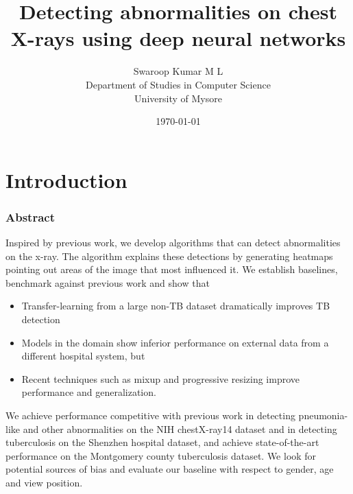 \documentclass[8pt]{beamer}
\title{Detecting abnormalities on chest X-rays using deep neural networks}
\author{
  Swaroop Kumar M L\\
  Department of Studies in Computer Science\\
  University of Mysore
}
\date{\today}
\begin{document}
\maketitle

\section{Introduction}

\begin{frame}
  \frametitle{Abstract} Inspired by previous work, we develop algorithms that
  can detect abnormalities on the x-ray. The algorithm explains these detections
  by generating heatmaps pointing out areas of the image that most influenced
  it. \pause We establish baselines, benchmark against previous work and show
  that \pause
  \begin{itemize}
  \item{Transfer-learning from a large non-TB dataset dramatically improves TB
      detection}\pause
  \item{Models in the domain show inferior performance on external data from a
      different hospital system, but}\pause
  \item{Recent techniques such as mixup and progressive resizing improve
      performance and generalization.}\pause
  \end{itemize}
  We achieve performance competitive with previous work in detecting
  pneumonia-like and other abnormalities on the NIH chestX-ray14 dataset and
  \pause in detecting tuberculosis on the Shenzhen hospital dataset, and achieve
  state-of-the-art performance on the Montgomery county tuberculosis dataset.
  \pause We look for potential sources of bias and evaluate our baseline with
  respect to gender, age and view position.
\end{frame}
\end{document}
